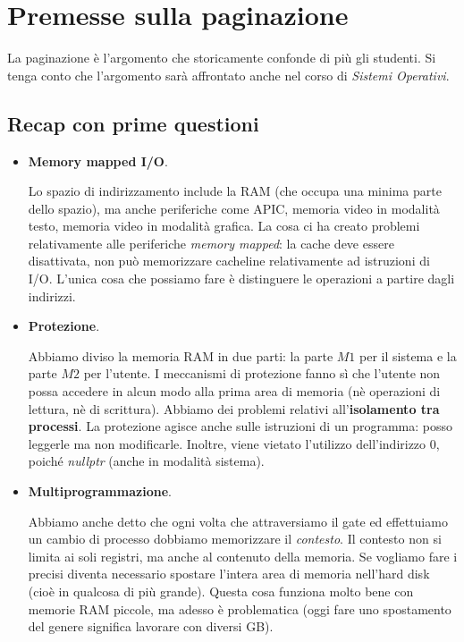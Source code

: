 
\chapter{Premesse sulla paginazione}
La paginazione è l'argomento che storicamente confonde di più gli studenti. Si tenga conto che l'argomento sarà affrontato anche nel corso di \textit{Sistemi Operativi}.
\section{Recap con prime questioni}
\begin{itemize}
	\item \textbf{Memory mapped I/O}. 
	
	Lo spazio di indirizzamento include la RAM (che occupa una minima parte dello spazio), ma anche periferiche come APIC, memoria video in modalità testo, memoria video in modalità grafica. La cosa ci ha creato problemi relativamente alle periferiche \emph{memory mapped}: la cache deve essere disattivata, non può memorizzare cacheline relativamente ad istruzioni di I/O. L'unica cosa che possiamo fare è distinguere le operazioni a partire dagli indirizzi.
	\item \textbf{Protezione}. 
	
	Abbiamo diviso la memoria RAM in due parti: la parte $M1$ per il sistema e la parte $M2$ per l'utente. I meccanismi di protezione fanno sì che l'utente non possa accedere in alcun modo alla prima area di memoria (nè operazioni di lettura, nè di scrittura).  Abbiamo dei problemi relativi all'\textbf{isolamento tra processi}. La protezione agisce anche sulle istruzioni di un programma: posso leggerle ma non modificarle. Inoltre, viene vietato l'utilizzo dell'indirizzo $0$, poiché \emph{nullptr} (anche in modalità sistema).
	\item \textbf{Multiprogrammazione}. 
	
	Abbiamo anche detto che ogni volta che attraversiamo il gate ed effettuiamo un cambio di processo dobbiamo memorizzare il \emph{contesto}. Il contesto non si limita ai soli registri, ma anche al contenuto della memoria. Se vogliamo fare i precisi diventa necessario spostare l'intera area di memoria nell'hard disk (cioè in qualcosa di più grande). Questa cosa funziona molto bene con memorie RAM piccole, ma adesso è problematica (oggi fare uno spostamento del genere significa lavorare con diversi GB).
\end{itemize} 
\clearpage 
